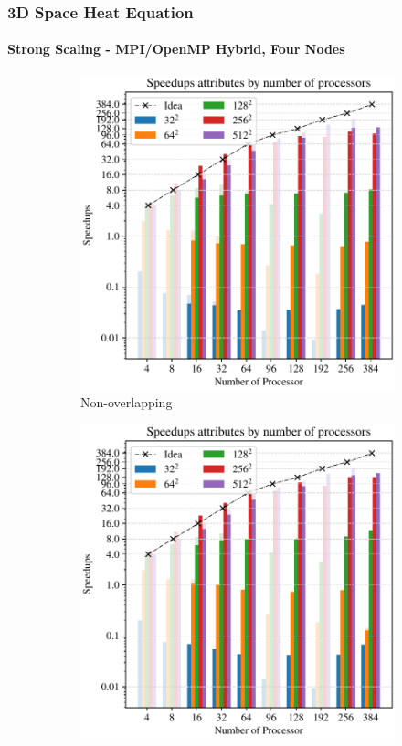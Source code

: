 \begin{frame}
  \frametitle{3D Space Heat Equation}
  \framesubtitle{Strong Scaling - MPI/OpenMP Hybrid, Four Nodes}
  

  
  \begin{figure}
    \centering
    \begin{subfigure}{0.42\textwidth}
      \centering
      \includegraphics[width=\textwidth]{figure/FIG_Benchmark_hybrid_0_multi_nodes_3D.pdf}
      \caption{Non-overlapping}
      \label{FIG:Benchmark:FIG_Benchmark_hybrid_0_multi_nodes_3D}
    \end{subfigure}
    \begin{subfigure}{0.42\textwidth}
      \centering
      \includegraphics[width=\textwidth]{figure/FIG_Benchmark_hybrid_1_multi_nodes_3D.pdf}

\end{subfigure}
\end{figure}
\end{frame}
